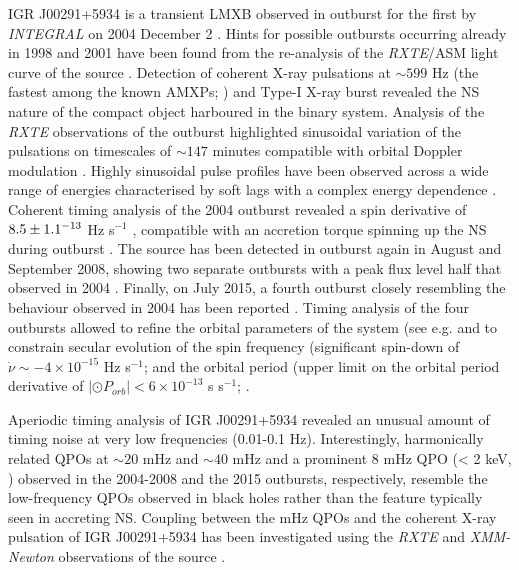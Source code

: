 \documentclass[graybox]{svmult}
\def \inte {{\em INTEGRAL\xspace}}
\def \xmm {{\em XMM-Newton\xspace}}
\def \rxte {{\em RXTE\xspace}}
\begin{document}
IGR J00291+5934 is a transient LMXB observed in outburst for the first by \inte{} on 2004 December 2 \cite{Shaw2005}. Hints for possible outbursts occurring already in 1998 and 2001 have been found from the re-analysis of the \rxte{}/ASM light curve of the source \cite{Remillard2004}. Detection of coherent X-ray pulsations at $\sim599$ Hz (the fastest among the known AMXPs; \cite{Eckert2004,Markwardt2004a}) and Type-I X-ray burst \cite{Kuin2015} revealed the NS nature of the compact object harboured in the binary system. Analysis of the \rxte{} observations of the outburst highlighted sinusoidal variation of the pulsations on timescales of $\sim147$ minutes compatible with orbital Doppler modulation \cite{Markwardt2004b,Galloway2005}. Highly sinusoidal pulse profiles have been observed across a wide range of energies \cite{Galloway2005,Falanga2005b} characterised by soft lags with a complex energy dependence \cite{Galloway2005,Falanga2007}. Coherent timing analysis of the 2004 outburst revealed a spin derivative of $8.5\pm1.1 \time 10^{-13}$ Hz s$^{-1}$ \cite{Falanga2005b,Burderi2007}, compatible with an accretion torque spinning up the NS during outburst \cite{Burderi2007}.  
The source has been detected in outburst again in August and September 2008, showing two separate outbursts with a peak flux level half that observed in 2004 \cite{Chakrabarty2008, Lewis2008}. Finally, on July 2015, a fourth outburst closely resembling the behaviour observed in 2004 has been reported \cite{Sanna2015,DeFalco2017,Sanna2017d}. Timing analysis of the four outbursts allowed to refine the orbital parameters of the system (see e.g. \cite{Patruno2010,Hartman2011,Papitto2011c,Sanna2017d} and to constrain secular evolution of the spin frequency (significant spin-down  of $\dot{\nu}\sim-4\times10^{-15}$ Hz s$^{-1}$; \cite{Patruno2010, Hartman2011, Papitto2011c} and the orbital period (upper limit on the orbital period derivative of $|\odot{P}_{orb}|< 6\times 10^{-13}$ s s$^{-1}$; \cite{Patruno2017,Sanna2017d}. 

Aperiodic timing analysis of IGR J00291+5934 revealed an unusual amount of timing noise at very low frequencies (0.01-0.1 Hz). Interestingly, harmonically related QPOs at $\sim20$ mHz and $\sim40$ mHz \cite{Linares2007,Hartman2011} and a prominent 8 mHz QPO (< 2 keV, \cite{Ferrigno2017}) observed in the 2004-2008 and the 2015 outbursts, respectively, resemble the low-frequency QPOs observed in black holes \cite{Linares2007} rather than the feature typically seen in accreting NS. Coupling between the mHz QPOs and the coherent X-ray pulsation of IGR J00291+5934 has been investigated using the \rxte{} and \xmm{} observations of the source \cite{Bult2017}.
\end{document}
